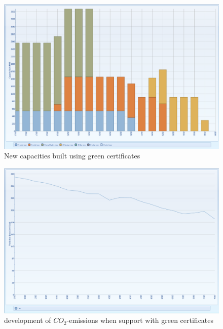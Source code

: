 \documentclass{article}
\begin{document}
\begin{figure}[htbp]
\begin{center}
\includegraphics[width=13cm,keepaspectratio=true]{figures/Expansion/GreenCertificate/CapacityBuiltNewGenGC}
\caption{New capacities built using green certificates}
\label{fig:CapacityBuiltNewGenGC}
\end{center}
\end{figure}
\begin{figure}[htbp]
\begin{center}
\includegraphics[width=13cm,keepaspectratio=true]{figures/Expansion/GreenCertificate/Co2ProductionGC}
\caption{development of $CO_2$-emissions when support with green certificates}
\label{fig:Co2ProductionGC}
\end{center}
\end{figure}
\end{document}
